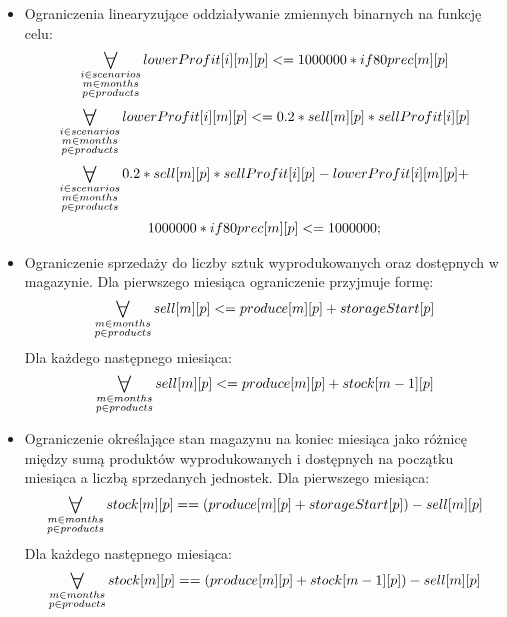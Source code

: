 \documentclass[11pt,a4paper]{article}
\newcommand\bigforall{%
  \mathop{\lower0.75ex\hbox{\ensuremath{%
    \mathlarger{\mathlarger{\mathlarger{\mathlarger{\forall}}}}}}}%
  \limits}
\begin{document}
\begin{itemize}
    \item Ograniczenia linearyzujące oddziaływanie zmiennych binarnych na funkcję celu:
	\begin{equation}
		\bigforall_{\substack{
			i \in scenarios\\			
			m \in months\\ 
			p \in products}} lowerProfit[i][m][p] <= 1000000 * if80prec[m][p]
	\end{equation}
	\begin{equation}
		\bigforall_{\substack{
			i \in scenarios\\			
			m \in months\\ 
			p \in products}} lowerProfit[i][m][p] <= 0.2 * sell[m][p]*sellProfit[i][p]
	\end{equation}
	\begin{multline}
		\bigforall_{\substack{
			i \in scenarios\\			
			m \in months\\ 
			p \in products}} 0.2 * sell[m][p]*sellProfit[i][p] - lowerProfit[i][m][p] +\\ 1000000 * if80prec[m][p] <= 1000000;
	\end{multline}
	
    \item Ograniczenie sprzedaży do liczby sztuk wyprodukowanych oraz dostępnych w magazynie. Dla pierwszego miesiąca ograniczenie przyjmuje formę:
	\begin{equation}
		\bigforall_{\substack{
			m \in months\\ 
			p \in products}} sell[m][p] <= produce[m][p]+storageStart[p]
	\end{equation}
	Dla każdego następnego miesiąca:
	\begin{equation}
		\bigforall_{\substack{
			m \in months\\ 
			p \in products}} sell[m][p] <= produce[m][p] + stock[m-1][p]
	\end{equation}
	
    \item Ograniczenie określające stan magazynu na koniec miesiąca jako różnicę między sumą produktów wyprodukowanych i dostępnych na początku miesiąca a liczbą sprzedanych jednostek. Dla pierwszego miesiąca:
	\begin{equation}
		\bigforall_{\substack{
			m \in months\\ 
			p \in products}} stock[m][p]==(produce[m][p] + storageStart[p])-sell[m][p]
	\end{equation}
	Dla każdego następnego miesiąca:
	\begin{equation}
		\bigforall_{\substack{
			m \in months\\ 
			p \in products}} stock[m][p]==(produce[m][p] + stock[m-1][p])-sell[m][p]
	\end{equation}

\end{itemize}
\end{document}
